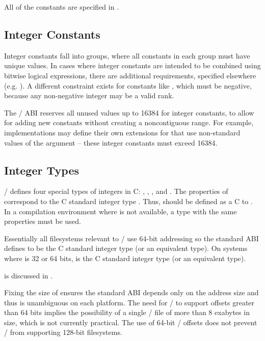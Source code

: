 All of the constants are specified in .

\subsection{Integer Constants}

Integer constants fall into groups, where all constants in each group must have unique values. 
In cases where integer constants are intended to be combined using bitwise logical expressions, 
there are additional requirements, specified elsewhere
(e.g. ).
A different constraint exists for constants like , 
which must be negative, because any non-negative integer may be a valid rank.

The \MPI/ ABI reserves all unused values up to 16384 for integer constants,
to allow for adding new constants without creating a noncontiguous range.
For example, implementations may define their own extensions for
 that use non-standard values of the
 argument -- these integer constants must exceed 16384.

\subsection{Integer Types}

\MPI/ defines four special types of integers in C:
, , ,
and .
The properties of  correspond to the C standard integer type .
Thus,  should be defined as a C  to .
In a compilation environment where  is not available,
a type with the same properties must be used.

Essentially all filesystems relevant to \MPI/ use 64-bit addressing
so the standard ABI defines 
to be the C standard integer type  (or an equivalent type).
On systems where  is 32 or 64 bits,
 is the C standard integer type  (or an equivalent type).

 is discussed in .

\begin{rationale}
Fixing the size of  ensures the standard ABI
depends only on the address size and thus is unambiguous
on each platform.
The need for \MPI/ to support offsets greater than 64 bits
implies the possibility of a single \MPI/ file of more
than 8 exabytes in size, which is not currently practical. %
The use of 64-bit \MPI/ offsets does not prevent \MPI/
from supporting 128-bit filesystems.
\end{rationale}

